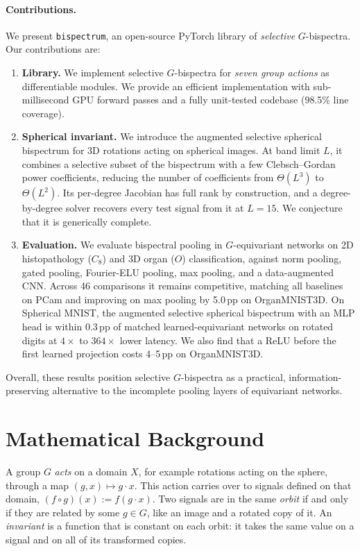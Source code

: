 \documentclass{article}
\theoremstyle{definition}
\theoremstyle{remark}
\theoremstyle{definition}
\begin{document}
\paragraph{Contributions.} We present \texttt{bispectrum}, an open-source PyTorch library of
\emph{selective} $G$-bispectra. Our contributions are:
\begin{enumerate}[leftmargin=*]
  \item \textbf{Library.} We implement selective
    $G$-bispectra for \emph{seven group actions} as differentiable modules. We provide an efficient implementation with sub-millisecond GPU forward passes and a fully unit-tested codebase (98.5\% line coverage).
  \item \textbf{Spherical invariant.}
    We introduce the augmented selective spherical bispectrum for 3D rotations acting on spherical images. At band limit $L$, it combines a selective subset of the bispectrum with a few Clebsch--Gordan power coefficients, reducing the number of coefficients from $\Theta(L^3)$ to $\Theta(L^2)$. Its per-degree Jacobian has full rank by construction, and a degree-by-degree solver recovers every test signal from it at $L{=}15$. We conjecture that it is generically complete.
 \item \textbf{Evaluation.} We evaluate bispectral
  pooling in $G$-equivariant networks on 2D histopathology ($C_8$) and 3D organ
  ($O$) classification, against norm pooling, gated pooling, Fourier-ELU
  pooling, max pooling, and a data-augmented CNN. Across 46 comparisons it
  remains competitive, matching all baselines on PCam and
  improving on max pooling by 5.0\,pp on OrganMNIST3D. On Spherical MNIST, the
  augmented selective spherical bispectrum with an MLP head is within 0.3\,pp of matched learned-equivariant
  networks on rotated digits at $4\times$ to $364\times$ lower latency. We also find that a
  ReLU before the first learned projection costs 4--5\,pp on OrganMNIST3D.
\end{enumerate}
Overall, these results position selective $G$-bispectra as a practical, information-preserving
alternative to the incomplete pooling layers of equivariant networks.

\section{Mathematical Background}
\label{sec:background}

A group $G$ \emph{acts} on a domain $X$, for example rotations acting on the sphere, through a
map $(g,x)\mapsto g\cdot x$. This action carries over to signals defined on that domain,
$(f\circ g)(x):= f(g\cdot x)$. Two signals are in the same \emph{orbit}
if and only if they are related by some $g\in G$, like an image and a rotated copy of it. An
\emph{invariant} is a function that is constant on each orbit: it takes the same value on a
signal and on all of its transformed copies.
\end{document}
